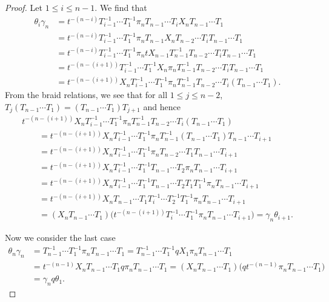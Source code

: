 \documentclass[pdftex]{sigma}
\numberwithin{equation}{section}
\theoremstyle{definition}
\begin{document}
\begin{proof}
 Let $1 \leq i \leq n-1$. We find that
 \begin{align*}
 \theta_i\gamma_n& = t^{-(n-i)}T_{i-1}^{-1}\cdots T_1^{-1} \pi_n T_{n-1}\cdots T_i X_n T_{n-1}\cdots T_1 \\
 & = t^{-(n-i)}T_{i-1}^{-1}\cdots T_1^{-1} \pi_n T_{n-1}X_n T_{n-2}\cdots T_i T_{n-1} \cdots T_1 \\
 & = t^{-(n-i)}T_{i-1}^{-1}\cdots T_1^{-1}\pi_n tX_{n-1}T_{n-1}^{-1} T_{n-2}\cdots T_i T_{n-1} \cdots T_1 \\
 & = t^{-(n-(i+1))} T_{i-1}^{-1}\cdots T_1^{-1} X_n \pi_n T_{n-1}^{-1} T_{n-2}\cdots T_i T_{n-1}\cdots T_1 \\
 & = t^{-(n-(i+1))} X_n T_{i-1}^{-1}\cdots T_1^{-1} \pi_n T_{n-1}^{-1} T_{n-2}\cdots T_i (T_{n-1}\cdots T_1).
 \end{align*}
 From the braid relations, we see that for all $1\leq j \leq n-2$, $T_j(T_{n-1}\cdots T_1) = (T_{n-1}\cdots T_1)T_{j+1}$
 and hence
 \begin{gather*}
 t^{-(n-(i+1))} X_n T_{i-1}^{-1}\cdots T_1^{-1} \pi_n T_{n-1}^{-1} T_{n-2}\cdots T_i (T_{n-1}\cdots T_1) \\
 \qquad = t^{-(n-(i+1))} X_n T_{i-1}^{-1}\cdots T_1^{-1} \pi_n T_{n-1}^{-1}(T_{n-1}\cdots T_1)T_{n-1}\cdots T_{i+1} \\
 \qquad= t^{-(n-(i+1))} X_n T_{i-1}^{-1}\cdots T_1^{-1} \pi_n T_{n-2} \cdots T_1 T_{n-1}\cdots T_{i+1} \\
 \qquad= t^{-(n-(i+1))} X_n T_{i-1}^{-1}\cdots T_1^{-1} T_{n-1} \cdots T_2 \pi_n T_{n-1}\cdots T_{i+1}\\
 \qquad= t^{-(n-(i+1))} X_n T_{i-1}^{-1}\cdots T_1^{-1} T_{n-1} \cdots T_2 T_1T_1^{-1}\pi_n T_{n-1}\cdots T_{i+1}\\
 \qquad= t^{-(n-(i+1))} X_nT_{n-1} \cdots T_1T_{i}^{-1}\cdots T_2^{-1}T_1^{-1}\pi_n T_{n-1}\cdots T_{i+1}\\
 \qquad= (X_nT_{n-1} \cdots T_1) \bigl(t^{-(n-(i+1))}T_{i}^{-1}\cdots T_1^{-1}\pi_n T_{n-1}\cdots T_{i+1}\bigr)
 = \gamma_n \theta_{i+1}.
 \end{gather*}

 Now we consider the last case
 \begin{align*}
 \theta_n \gamma_n& = T_{n-1}^{-1}\cdots T_1^{-1} \pi_n T_{n-1}\cdots T_1 = T_{n-1}^{-1}\cdots T_1^{-1} qX_1 \pi_n T_{n-1}\cdots T_1 \\
 & = t^{-(n-1)}X_n T_{n-1}\cdots T_1 q\pi_n T_{n-1}\cdots T_1= (X_nT_{n-1} \cdots T_1) \bigl(qt^{-(n-1)}\pi_n T_{n-1}\cdots T_1\bigr) \\
 & = \gamma_n q\theta_1.\tag*{\qed}
 \end{align*} \renewcommand{\qed}{}
\end{proof}
\end{document}
